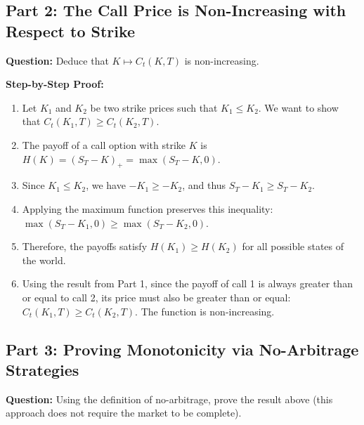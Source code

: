 \subsection{Part 2: The Call Price is Non-Increasing with Respect to Strike}

\textbf{Question:} Deduce that $K \mapsto C_t(K,T)$ is non-increasing.

\textbf{Step-by-Step Proof:}
\begin{enumerate}
    \item Let $K_1$ and $K_2$ be two strike prices such that $K_1 \le K_2$. We want to show that $C_t(K_1, T) \ge C_t(K_2, T)$.
    \item The payoff of a call option with strike $K$ is $H(K) = (S_T - K)_+ = \max(S_T - K, 0)$.
    \item Since $K_1 \le K_2$, we have $-K_1 \ge -K_2$, and thus $S_T - K_1 \ge S_T - K_2$.
    \item Applying the maximum function preserves this inequality: $\max(S_T - K_1, 0) \ge \max(S_T - K_2, 0)$.
    \item Therefore, the payoffs satisfy $H(K_1) \ge H(K_2)$ for all possible states of the world.
    \item Using the result from Part 1, since the payoff of call 1 is always greater than or equal to call 2, its price must also be greater than or equal: $C_t(K_1, T) \ge C_t(K_2, T)$. The function is non-increasing.
\end{enumerate}

\subsection{Part 3: Proving Monotonicity via No-Arbitrage Strategies}

\textbf{Question:} Using the definition of no-arbitrage, prove the result above (this approach does not require the market to be complete).

